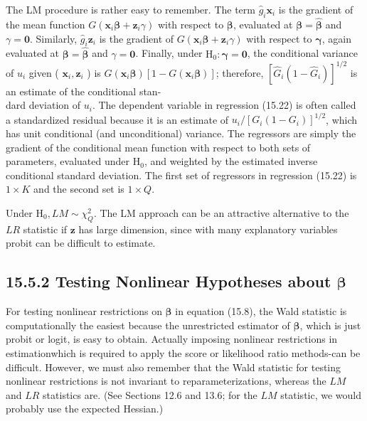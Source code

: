 \documentclass[10pt]{article}
\begin{document}
The LM procedure is rather easy to remember. The term $\hat{g}_{i} \mathbf{x}_{i}$ is the gradient of the mean function $G\left(\mathbf{x}_{i} \boldsymbol{\beta}+\mathbf{z}_{i} \gamma\right)$ with respect to $\boldsymbol{\beta}$, evaluated at $\boldsymbol{\beta}=\hat{\boldsymbol{\beta}}$ and $\gamma=\mathbf{0}$. Similarly, $\hat{g}_{i} \mathbf{z}_{i}$ is the gradient of $G\left(\mathbf{x}_{i} \boldsymbol{\beta}+\mathbf{z}_{i} \gamma\right)$ with respect to $\boldsymbol{\gamma}$, again evaluated at $\boldsymbol{\beta}=\hat{\boldsymbol{\beta}}$ and $\gamma=\mathbf{0}$. Finally, under $\mathrm{H}_{0}: \boldsymbol{\gamma}=\mathbf{0}$, the conditional variance of $u_{i}$ given ( $\mathbf{x}_{i}, \mathbf{z}_{i}$ ) is $G\left(\mathbf{x}_{i} \boldsymbol{\beta}\right)\left[1-G\left(\mathbf{x}_{i} \boldsymbol{\beta}\right)\right]$; therefore, $\left[\hat{G}_{i}\left(1-\hat{G}_{i}\right)\right]^{1 / 2}$ is an estimate of the conditional stan-\\
dard deviation of $u_{i}$. The dependent variable in regression (15.22) is often called a standardized residual because it is an estimate of $u_{i} /\left[G_{i}\left(1-G_{i}\right)\right]^{1 / 2}$, which has unit conditional (and unconditional) variance. The regressors are simply the gradient of the conditional mean function with respect to both sets of parameters, evaluated under $\mathrm{H}_{0}$, and weighted by the estimated inverse conditional standard deviation. The first set of regressors in regression (15.22) is $1 \times K$ and the second set is $1 \times Q$.

Under $\mathrm{H}_{0}, L M \sim \chi_{Q}^{2}$. The LM approach can be an attractive alternative to the $L R$ statistic if $\mathbf{z}$ has large dimension, since with many explanatory variables probit can be difficult to estimate.

\subsection*{15.5.2 Testing Nonlinear Hypotheses about $\boldsymbol{\beta}$}
For testing nonlinear restrictions on $\boldsymbol{\beta}$ in equation (15.8), the Wald statistic is computationally the easiest because the unrestricted estimator of $\boldsymbol{\beta}$, which is just probit or logit, is easy to obtain. Actually imposing nonlinear restrictions in estimationwhich is required to apply the score or likelihood ratio methods-can be difficult. However, we must also remember that the Wald statistic for testing nonlinear restrictions is not invariant to reparameterizations, whereas the $L M$ and $L R$ statistics are. (See Sections 12.6 and 13.6; for the $L M$ statistic, we would probably use the expected Hessian.)
\end{document}

